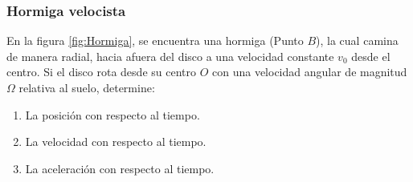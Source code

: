 \subsubsection{Hormiga velocista}
En la figura \ref{fig:Hormiga}, se encuentra una hormiga (Punto $B$), la cual camina de manera radial, hacia afuera del disco a una velocidad constante $v_0$ desde el centro. Si el disco rota desde su centro $O$ con una velocidad angular de magnitud $\Omega$ relativa al suelo, determine:
\begin{enumerate}
    \item La posición con respecto al tiempo.
    \item La velocidad con respecto al tiempo.
    \item La aceleración con respecto al tiempo.
\end{enumerate}

